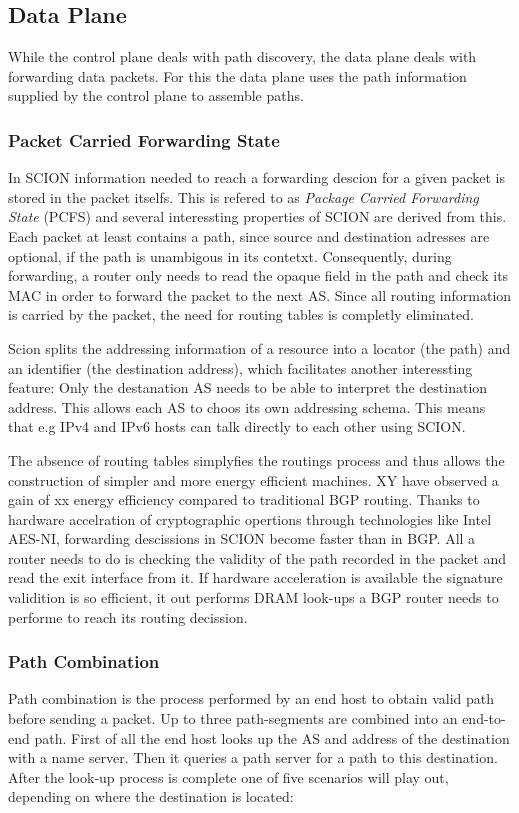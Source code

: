 \documentclass[../eva1_scion.tex]{subfiles}
\begin{document}
    \subsection{Data Plane}
    While the control plane deals with path discovery, the data plane deals with forwarding data packets. For this the data plane uses the path information supplied by the control plane to assemble paths.

    \subsubsection{Packet Carried Forwarding State}\label{sssec:pcfs}
    In SCION information needed to reach a forwarding descion for a given packet is stored in the packet itselfs. This is refered to as \textit{Package Carried Forwarding State} (PCFS) and several interessting properties of SCION are derived from this. Each packet at least contains a path, since source and destination adresses are optional, if the path is unambigous in its contetxt. Consequently, during forwarding, a router only needs to read the opaque field in the path and check its MAC in order to forward the packet to the next AS. Since all routing information is carried by the packet, the need for routing tables is completly eliminated.

    Scion splits the addressing information of a resource into a locator (the path) and an identifier (the destination address), which facilitates another interessting feature: Only the destanation AS needs to be able to interpret the destination address. This allows each AS to choos its own addressing schema. This means that e.g IPv4 and IPv6 hosts can talk directly to each other using SCION.

    The absence of routing tables simplyfies the routings process and thus allows the construction of simpler and more energy efficient machines. XY have observed a gain of xx  energy efficiency compared to traditional BGP routing. Thanks to hardware accelration of cryptographic opertions through technologies like Intel AES-NI, forwarding descissions in SCION become faster than in BGP. All a router needs to do is checking the validity of the path recorded in the packet and read the exit interface from it. If hardware acceleration is available the signature validition is so efficient, it out performs DRAM look-ups a BGP router needs to performe to reach its routing decission. 

    \subsubsection{Path Combination} \label{sssec:path_assembly}
    Path combination is the process performed by an end host to obtain valid path before sending a packet. Up to three path-segments are combined into an end-to-end path. First of all the end host looks up the AS and address of the destination with a name server. Then it queries a path server for a path to this destination. After the look-up process is complete one of five scenarios will play out, depending on where the destination is located:
\end{document}
